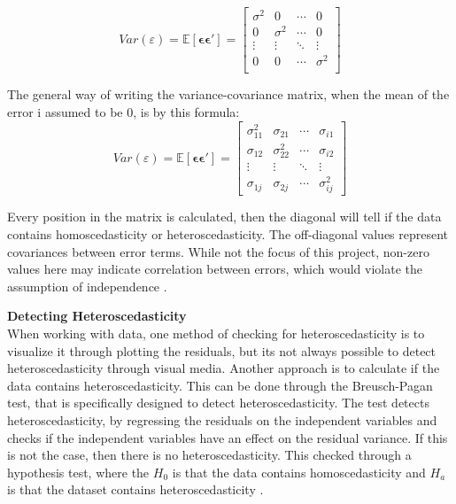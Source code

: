 	
\begin{equation}
Var(\varepsilon) = \mathbb{E}[\boldsymbol{\epsilon} \boldsymbol{\epsilon}'] = 
\left[
\begin{array}{cccc}
	\sigma^2 & 0        & \cdots & 0 \\
	0        & \sigma^2 & \cdots & 0 \\
	\vdots   & \vdots   & \ddots & \vdots \\
	0        & 0        & \cdots & \sigma^2 \\
\end{array}
\right]
\end{equation}


\noindent The general way of writing the variance-covariance matrix, when the mean of the error i assumed to be $0$, is by this formula:
\begin{equation}
Var(\varepsilon) = \mathbb{E}[\boldsymbol{\epsilon} \boldsymbol{\epsilon}'] = 
\left[
\begin{array}{cccc}
	\sigma^2_{11} & \sigma_{21} & \cdots & \sigma_{i1} \\
	\sigma_{12} & \sigma^2_{22} & \cdots & \sigma_{i2} \\
	\vdots      & \vdots      & \ddots & \vdots      \\
	\sigma_{1j} & \sigma_{2j} & \cdots & \sigma^2_{ij}
\end{array}
\right]
\end{equation}

\noindent Every position in the matrix is calculated, then the diagonal will tell if the data contains homoscedasticity or heteroscedasticity. The off-diagonal values represent covariances between error terms. While not the focus of this project, non-zero values here may indicate correlation between errors, which would violate the assumption of independence \cite{Heteroscedasticity} . \newline 

\noindent \textbf{Detecting Heteroscedasticity} \\
When working with data, one method of checking for heteroscedasticity is to visualize it through plotting the residuals, but its not always possible to detect heteroscedasticity through visual media. Another approach is to calculate if the data contains heteroscedasticity. This can be done through the Breusch-Pagan test, that is specifically designed to detect heteroscedasticity. The test detects heteroscedasticity, by regressing the residuals on the independent variables and checks if the independent variables have an effect on the residual variance. If this is not the case, then there is no heteroscedasticity. This checked through a hypothesis test, where the $H_0$ is that the data contains homoscedasticity and $H_a$ is that the dataset contains heteroscedasticity \cite{HomoSce}. \newline

